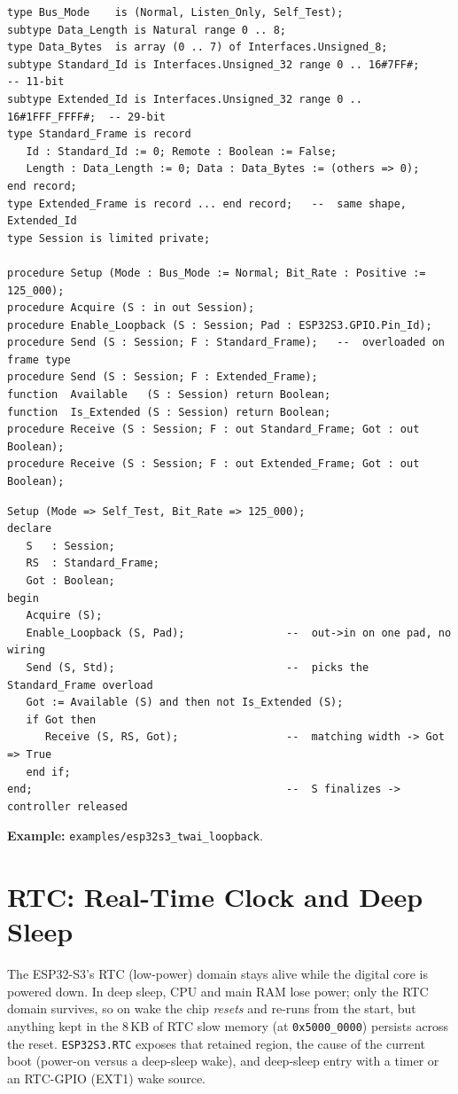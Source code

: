 \begin{lstlisting}
type Bus_Mode    is (Normal, Listen_Only, Self_Test);
subtype Data_Length is Natural range 0 .. 8;
type Data_Bytes  is array (0 .. 7) of Interfaces.Unsigned_8;
subtype Standard_Id is Interfaces.Unsigned_32 range 0 .. 16#7FF#;        -- 11-bit
subtype Extended_Id is Interfaces.Unsigned_32 range 0 .. 16#1FFF_FFFF#;  -- 29-bit
type Standard_Frame is record
   Id : Standard_Id := 0; Remote : Boolean := False;
   Length : Data_Length := 0; Data : Data_Bytes := (others => 0);
end record;
type Extended_Frame is record ... end record;   --  same shape, Extended_Id
type Session is limited private;

procedure Setup (Mode : Bus_Mode := Normal; Bit_Rate : Positive := 125_000);
procedure Acquire (S : in out Session);
procedure Enable_Loopback (S : Session; Pad : ESP32S3.GPIO.Pin_Id);
procedure Send (S : Session; F : Standard_Frame);   --  overloaded on frame type
procedure Send (S : Session; F : Extended_Frame);
function  Available   (S : Session) return Boolean;
function  Is_Extended (S : Session) return Boolean;
procedure Receive (S : Session; F : out Standard_Frame; Got : out Boolean);
procedure Receive (S : Session; F : out Extended_Frame; Got : out Boolean);
\end{lstlisting}

\begin{lstlisting}
Setup (Mode => Self_Test, Bit_Rate => 125_000);
declare
   S   : Session;
   RS  : Standard_Frame;
   Got : Boolean;
begin
   Acquire (S);
   Enable_Loopback (S, Pad);                --  out->in on one pad, no wiring
   Send (S, Std);                           --  picks the Standard_Frame overload
   Got := Available (S) and then not Is_Extended (S);
   if Got then
      Receive (S, RS, Got);                 --  matching width -> Got => True
   end if;
end;                                        --  S finalizes -> controller released
\end{lstlisting}

\noindent\textbf{Example:} \texttt{examples/esp32s3\_twai\_loopback}.

\section{RTC: Real-Time Clock and Deep Sleep}
\label{app:int:rtc}

The ESP32-S3's RTC (low-power) domain stays alive while the digital core is
powered down. In deep sleep, CPU and main RAM lose power; only the RTC domain
survives, so on wake the chip \emph{resets} and re-runs from the start, but
anything kept in the 8\,KB of RTC slow memory (at \texttt{0x5000\_0000}) persists
across the reset. \texttt{ESP32S3.RTC} exposes that retained region, the cause of
the current boot (power-on versus a deep-sleep wake), and deep-sleep entry with a
timer or an RTC-GPIO (EXT1) wake source.

